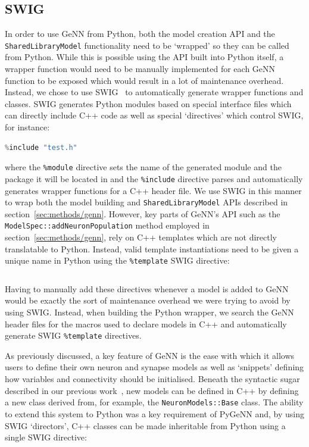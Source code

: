 \documentclass[utf8]{frontiersSCNS} %
\begin{document}
\subsection{SWIG}
In order to use GeNN from Python, both the model creation API and the \lstinline{SharedLibraryModel} functionality need to be `wrapped' so they can be called from Python.
While this is possible using the API built into Python itself, a wrapper function would need to be manually implemented for each GeNN function to be exposed which would result in a lot of maintenance overhead.
Instead, we chose to use SWIG~\citep{Beazley1996} to automatically generate wrapper functions and classes. 
SWIG generates Python modules based on special interface files which can directly include C++ code as well as special `directives' which control SWIG, for instance:
%
\begin{lstlisting}[language=C++]
%module(package="package") package
%include "test.h" 
\end{lstlisting}
%
where the \lstinline{%module} directive sets the name of the generated module and the package it will be located in and the \lstinline{%include} directive parses and automatically generates wrapper functions for a C++ header file.
We use SWIG in this manner to wrap both the model building and \lstinline{SharedLibraryModel} APIs described in section~\ref{sec:methods/genn}.
However, key parts of GeNN's API such as the \lstinline{ModelSpec::addNeuronPopulation} method employed in section~\ref{sec:methods/genn}, rely on C++ templates which are not directly translatable to Python.
Instead, valid template instantiations need to be given a unique name in Python using the \lstinline{%template} SWIG directive:
%
\begin{lstlisting}[language=C++]
%template(addNeuronPopulationLIF) ModelSpec::addNeuronPopulation<NeuronModels::LIF>;
\end{lstlisting}
%
Having to manually add these directives whenever a model is added to GeNN would be exactly the sort of maintenance overhead we were trying to avoid by using SWIG.
Instead, when building the Python wrapper, we search the GeNN header files for the macros used to declare models in C++ and automatically generate SWIG \lstinline{%template} directives.

As previously discussed, a key feature of GeNN is the ease with which it allows users to define their own neuron and synapse models as well as `snippets' defining how variables and connectivity should be initialised.
Beneath the syntactic sugar described in our previous work~\citep{Knight2018}, new models can be defined in C++ by defining a new class derived from, for example, the \lstinline{NeuronModels::Base} class.
The ability to extend this system to Python was a key requirement of PyGeNN and, by using SWIG `directors', C++ classes can be made inheritable from Python using a single SWIG directive:
%
\begin{lstlisting}[language=C++]
%feature("director") NeuronModels::Base; 
\end{lstlisting}
\end{document}
